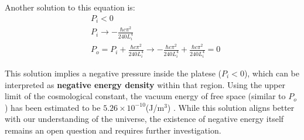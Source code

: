 Another solution to this equation is:
\begin{align}
    &P_i < 0 \\
    &P_i \rightarrow -\frac{\hbar c \pi^2}{240 L_i^4} \\
    &P_o = P_i + \frac{\hbar c \pi^2}{240 L_i^4} \rightarrow -\frac{\hbar c \pi^2}{240 L_i^4} + \frac{\hbar c \pi^2}{240 L_i^4} = 0
\end{align}

This solution implies a negative pressure inside the platese ($P_i < 0$), 
which can be interpreted as \textbf{negative energy density} within that region.
Using the upper limit of the cosmological constant, 
the vacuum energy of free space (similar to $P_o$) has been estimated to be $5.26\times10^{-10}$(J/m$^3$)  \citep*{collaboration2020planck}.
While this solution aligns better with our understanding of the universe, 
the existence of negative energy itself remains an open question and requires further investigation.\\

